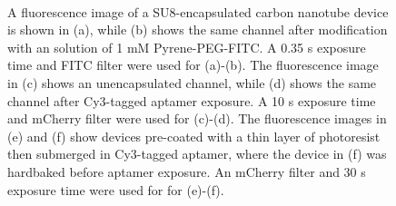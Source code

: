 \documentclass[
  a4paper,
]{scrbook}
\begin{document}
\begin{figure}
\begin{minipage}[t]{0.47\linewidth}
{{}

}

\subcaption{\label{fig-aptamer-photoresist-3}}
\end{minipage}%
%
\begin{minipage}[t]{0.05\linewidth}

{\centering 

~

}

\end{minipage}%
%
\begin{minipage}[t]{0.47\linewidth}

{\centering 


}

\subcaption{\label{fig-aptamer-photoresist-4}}
\end{minipage}%

\caption{\label{fig-photoresist-contamination}A fluorescence image of a
SU8-encapsulated carbon nanotube device is shown in (a), while (b) shows
the same channel after modification with an solution of 1 mM
Pyrene-PEG-FITC. A 0.35 s exposure time and FITC filter were used for
(a)-(b). The fluorescence image in (c) shows an unencapsulated channel,
while (d) shows the same channel after Cy3-tagged aptamer exposure. A 10
s exposure time and mCherry filter were used for (c)-(d). The
fluorescence images in (e) and (f) show devices pre-coated with a thin
layer of photoresist then submerged in Cy3-tagged aptamer, where the
device in (f) was hardbaked before aptamer exposure. An mCherry filter
and 30 s exposure time were used for for (e)-(f).}

\end{figure}
\end{document}
